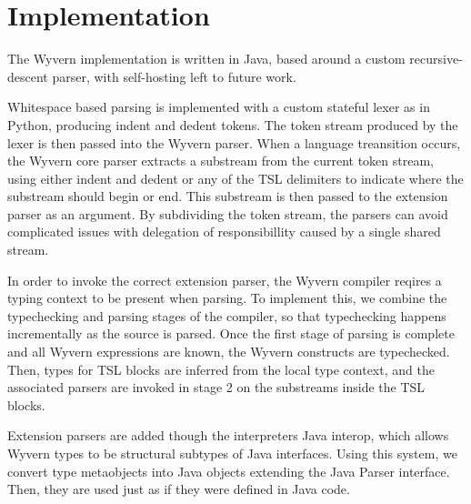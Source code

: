 
\section{Implementation}
\label{s:implementation}
The Wyvern implementation is written in Java, based around a custom recursive-descent parser, with self-hosting left to future work.

Whitespace based parsing is implemented with a custom stateful lexer as in Python, producing indent and dedent tokens. The token stream produced by the lexer is then passed into the Wyvern parser. When a language treansition occurs, the Wyvern core parser extracts a substream from the current token stream, using either indent and dedent or any of the TSL delimiters to indicate where the substream should begin or end. This substream is then passed to the extension parser as an argument. By subdividing the token stream, the parsers can avoid complicated issues with delegation of responsibillity caused by a single shared stream. 

In order to invoke the correct extension parser, the Wyvern compiler reqires a typing context to be present when parsing. To implement this, we combine the typechecking and parsing stages of the compiler, so that typechecking happens incrementally as the source is parsed. Once the first stage of parsing is complete and all Wyvern expressions are known, the Wyvern constructs are typechecked. Then, types for TSL blocks are inferred from the local type context, and the associated parsers are invoked in stage 2 on the substreams inside the TSL blocks.

Extension parsers are added though the interpreters Java interop, which allows Wyvern types to be structural subtypes of Java interfaces. Using this system, we convert type metaobjects into Java objects extending the Java Parser interface. Then, they are used just as if they were defined in Java code.